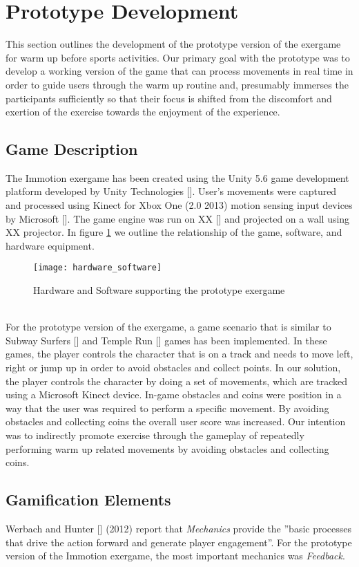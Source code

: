 \section{Prototype Development}
This section outlines the development of the prototype version of the exergame for warm up before sports activities. Our primary goal with the prototype was to develop a working version of the game that can process movements in real time in order to guide users through the warm up routine and, presumably immerses the participants sufficiently so that their focus is shifted from the discomfort and exertion of the exercise towards the enjoyment of the experience.

\subsection{Game Description}
The Immotion exergame has been created using the Unity 5.6 game development platform developed by Unity Technologies []. User's movements were captured and processed using Kinect for Xbox One (2.0 2013) motion sensing input devices by Microsoft []. The game engine was run on XX [] and projected on a wall using XX projector. In figure \ref{fig:hs} we outline the relationship of the game, software, and hardware equipment.
\begin{figure}[h]
    \centering
    \texttt{[image: hardware\_software]}
    \caption{Hardware and Software supporting the prototype exergame}
    \label{fig:hs}
\end{figure}\\
For the prototype version of the exergame, a game scenario that is similar to Subway Surfers [] and Temple Run [] games has been implemented. In these games, the player controls the character that is on a track and needs to move left, right or jump up in order to avoid obstacles and collect points. In our solution, the player controls the character by doing a set of movements, which are tracked using a Microsoft Kinect device. In-game obstacles and coins were position in a way that the user was required to perform a specific movement. By avoiding obstacles and collecting coins the overall user score was increased. Our intention was to indirectly promote exercise through the gameplay of repeatedly performing warm up related movements by avoiding obstacles and collecting coins.

\subsection{Gamification Elements}
Werbach and Hunter [] (2012) report that \textit{Mechanics} provide the ''basic processes that drive the action forward and generate
player engagement''. For the prototype version of the Immotion exergame, the most important mechanics was \textit{Feedback}.


